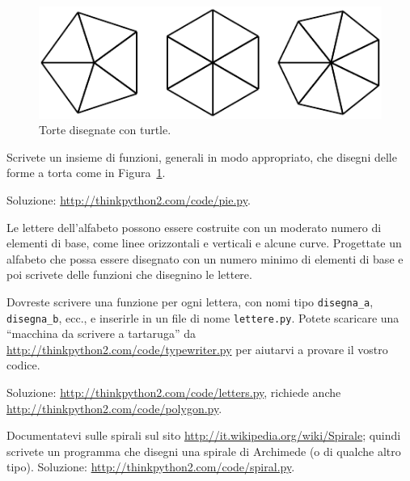 \documentclass[10pt]{book}
\begin{document}
\begin{figure}
\centerline
{\includegraphics[scale=0.8]{figs/pies.pdf}}
\caption{Torte disegnate con turtle.}
\label{fig.pies}
\end{figure}

\vspace{0.2in}
\begin{exercise}

Scrivete un insieme di funzioni, generali in modo appropriato, che disegni delle forme a torta come in Figura~\ref{fig.pies}.

Soluzione: \url{http://thinkpython2.com/code/pie.py}.

\end{exercise}

\vspace{0.2in}
\begin{exercise}

Le lettere dell'alfabeto possono essere costruite con un moderato numero di elementi di base, come linee orizzontali e verticali e alcune curve. Progettate un alfabeto che possa essere disegnato con un numero minimo di elementi di base e poi scrivete delle funzioni che disegnino le lettere.

Dovreste scrivere una funzione per ogni lettera, con nomi tipo
\verb"disegna_a", \verb"disegna_b", ecc., e inserirle in un file di nome {\tt lettere.py}.  Potete scaricare una ``macchina da scrivere a tartaruga'' da \url{http://thinkpython2.com/code/typewriter.py}
per aiutarvi a provare il vostro codice.

Soluzione: \url{http://thinkpython2.com/code/letters.py}, richiede anche
\url{http://thinkpython2.com/code/polygon.py}.

\end{exercise}

\vspace{0.2in}
\begin{exercise}

Documentatevi sulle spirali sul sito \url{http://it.wikipedia.org/wiki/Spirale}; quindi scrivete un programma che disegni una spirale di Archimede (o di qualche altro tipo).  Soluzione: \url{http://thinkpython2.com/code/spiral.py}.

\end{exercise}
\end{document}
